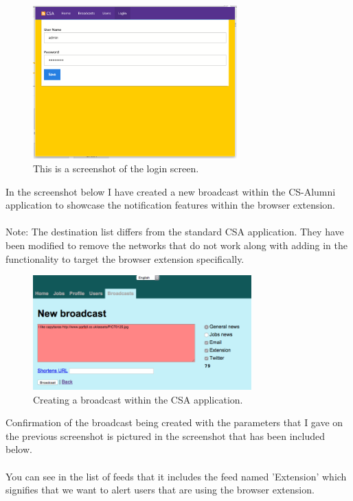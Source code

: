 \documentclass{article}
\begin{document}
\begin{figure}[H]
\centering
\includegraphics[width=0.7\textwidth]{loginpage}
\caption{This is a screenshot of the login screen.}
\end{figure}

In the screenshot below I have created a new broadcast within the CS-Alumni application to showcase the notification features within the browser extension.\\
\\
Note: The destination list differs from the standard CSA application. They have been modified to remove the networks that do not work along with adding in the functionality to target the browser extension specifically.\\

\begin{figure}[H]
\centering
\includegraphics[width=0.75\textwidth]{createbc}
\caption{Creating a broadcast within the CSA application.}
\end{figure}

\newpage
Confirmation of the broadcast being created with the parameters that I gave on the previous screenshot is pictured in the screenshot that has been included below.\\
\\
You can see in the list of feeds that it includes the feed named 'Extension' which signifies that we want to alert users that are using the browser extension.
\end{document}
